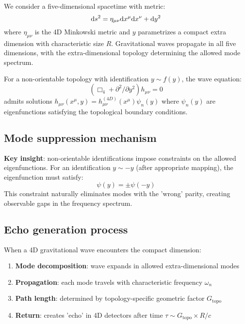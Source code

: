 \documentclass[12pt]{article}
\begin{document}
We consider a five-dimensional spacetime with metric:
\begin{equation}
{\rm d}s^2 = \eta_{\mu\nu} {\rm d}x^\mu {\rm d}x^\nu + {\rm d}y^2
\end{equation}
where $\eta_{\mu\nu}$ is the 4D Minkowski metric and $y$ parametrizes a compact extra dimension with characteristic size $R$. Gravitational waves propagate in all five dimensions, with the extra-dimensional topology determining the allowed mode spectrum.

For a non-orientable topology with identification $y \sim f(y)$, the wave equation:
\begin{equation}
(\Box_4 + \partial^2/\partial y^2)h_{\mu\nu} = 0
\end{equation}
admits solutions $h_{\mu\nu}(x^\mu, y) = h_{\mu\nu}^{(4D)}(x^\mu) \psi_n(y)$ where $\psi_n(y)$ are eigenfunctions satisfying the topological boundary conditions.

\subsection{Mode suppression mechanism}

\textbf{Key insight}: non-orientable identifications impose constraints on the allowed eigenfunctions. For an identification $y \sim -y$ (after appropriate mapping), the eigenfunction must satisfy:
\begin{equation}
\psi(y) = \pm\psi(-y)
\end{equation}
This constraint naturally eliminates modes with the 'wrong' parity, creating observable gaps in the frequency spectrum.

\subsection{Echo generation process}

When a 4D gravitational wave encounters the compact dimension:
\begin{enumerate}
\item \textbf{Mode decomposition}: wave expands in allowed extra-dimensional modes
\item \textbf{Propagation}: each mode travels with characteristic frequency $\omega_n$
\item \textbf{Path length}: determined by topology-specific geometric factor $G_{\mathrm{topo}}$
\item \textbf{Return}: creates 'echo' in 4D detectors after time $\tau \sim G_{\mathrm{topo}} \times R/c$
\end{enumerate}
\end{document}

